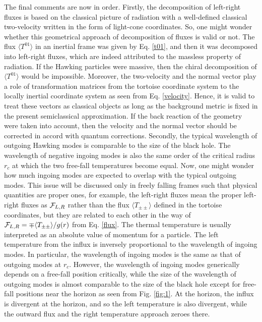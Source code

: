 \documentclass[aps,preprint,a4paper,showpacs,showkeys,superscriptaddress]{revtex4-1}
\begin{document}
The final comments are now in order.
Firstly, the decomposition of left-right fluxes is based on the classical picture of radiation
with a well-defined classical two-velocity written in the form of light-cone coordinates.
So, one might wonder whether this geometrical approach of decomposition of fluxes
is valid or not. The flux $\langle T^{01} \rangle$ in an inertial frame was given by Eq. \eqref{t01},
and then it
was decomposed into left-right fluxes, which are indeed attributed to the massless property of radiation.
If the Hawking particles were massive, then the chiral decomposition of $\langle T^{01} \rangle$
would be impossible. Moreover, the two-velocity and the normal vector play a role of
transformation matrices from the tortoise coordinate system to the locally inertial coordinate
system as seen from Eq. \eqref{velocity}.
Hence, it is valid to treat these vectors as classical objects
as long as the background metric is fixed in the present semiclassical approximation.
If the back reaction of the geometry were taken into account, then the velocity and the normal vector
should be corrected in accord with quantum corrections.
Secondly, the typical wavelength of outgoing Hawking modes
is comparable to the size of the black hole.
The wavelength of negative ingoing modes
is also the same order of the critical radius $r_c$ at which the two free-fall temperatures become equal.
Now, one might wonder
how much ingoing modes are expected to overlap with the typical
outgoing modes.
This issue will be discussed only in freely falling frames such that
physical quantities are proper ones, for example, the left-right fluxes mean the proper left-right fluxes
as ${\cal F}_{L,R}$ rather than
the flux $\langle T_{\pm\pm} \rangle$ defined in the tortoise coordinates, but
they are related to each other in the way of ${\cal F}_{L,R}=\mp \langle T_{\pm\pm} \rangle /g(r)$ from Eq. \eqref{flux}.
The thermal temperature is usually interpreted as an absolute value of momentum
for a particle. The left temperature from the influx is inversely proportional to the wavelength of ingoing modes.
In particular, the wavelength of ingoing modes is the same as that of outgoing modes at $r_c$.
However,
the wavelength of ingoing modes generically depends on a free-fall position critically, while
the size of the wavelength of outgoing modes is almost comparable to the size of the black hole except for
free-fall positions near the horizon as seen from Fig. \ref{fig:1}.
At the horizon, the influx is divergent at the horizon, and so the left temperature is also
divergent, while the outward flux and the right temperature approach zeroes there.
\end{document}
